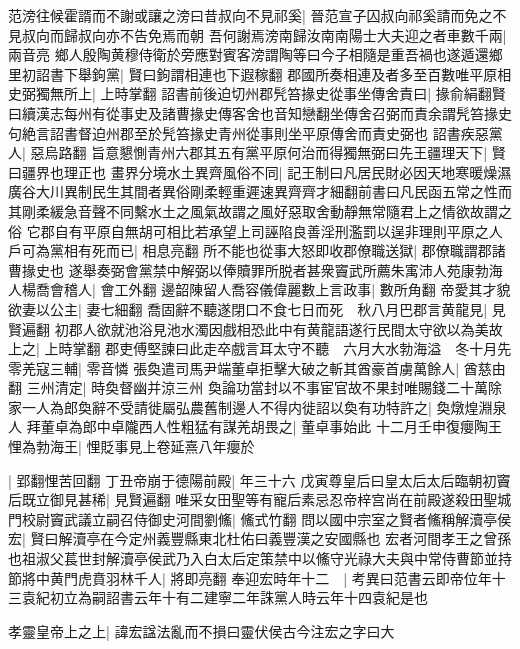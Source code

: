 范滂往候霍諝而不謝或讓之滂曰昔叔向不見祁奚|{
	晉范宣子囚叔向祁奚請而免之不見叔向而歸叔向亦不告免焉而朝}
吾何謝焉滂南歸汝南南陽士大夫迎之者車數千兩|{
	兩音亮}
鄉人殷陶黄穆侍衛於旁應對賓客滂謂陶等曰今子相隨是重吾禍也遂遁還鄉里初詔書下舉鉤黨|{
	賢曰鉤謂相連也下遐稼翻}
郡國所奏相連及者多至百數唯平原相史弼獨無所上|{
	上時掌翻}
詔書前後迫切州郡髠笞掾史從事坐傳舍責曰|{
	掾俞絹翻賢曰續漢志每州有從事史及諸曹掾史傳客舍也音知戀翻坐傳舍召弼而責余謂髠笞掾史句絶言詔書督迫州郡至於髠笞掾史青州從事則坐平原傳舍而責史弼也}
詔書疾惡黨人|{
	惡烏路翻}
旨意懇惻青州六郡其五有黨平原何治而得獨無弼曰先王疆理天下|{
	賢曰疆界也理正也}
畫界分境水土異齊風俗不同|{
	記王制曰凡居民財必因天地寒暖燥濕廣谷大川異制民生其間者異俗剛柔輕重遲速異齊齊才細翻前書曰凡民函五常之性而其剛柔緩急音聲不同繫水土之風氣故謂之風好惡取舍動靜無常隨君上之情欲故謂之俗}
它郡自有平原自無胡可相比若承望上司誣陷良善淫刑濫罰以逞非理則平原之人戶可為黨相有死而已|{
	相息亮翻}
所不能也從事大怒即收郡僚職送獄|{
	郡僚職謂郡諸曹掾史也}
遂舉奏弼會黨禁中解弼以俸贖罪所脱者甚衆竇武所薦朱㝢沛人苑康勃海人楊喬會稽人|{
	會工外翻}
邊韶陳留人喬容儀偉麗數上言政事|{
	數所角翻}
帝愛其才貌欲妻以公主|{
	妻七細翻}
喬固辭不聽遂閉口不食七日而死　秋八月巴郡言黄龍見|{
	見賢遍翻}
初郡人欲就池浴見池水濁因戲相恐此中有黄龍語遂行民間太守欲以為美故上之|{
	上時掌翻}
郡吏傅堅諫曰此走卒戲言耳太守不聽　六月大水勃海溢　冬十月先零羌寇三輔|{
	零音憐}
張奐遣司馬尹端董卓拒擊大破之斬其酋豪首虜萬餘人|{
	酋慈由翻}
三州清定|{
	時奐督幽并涼三州}
奐論功當封以不事宦官故不果封唯賜錢二十萬除家一人為郎奐辭不受請徙屬弘農舊制邊人不得内徙詔以奐有功特許之|{
	奐燉煌淵泉人}
拜董卓為郎中卓隴西人性粗猛有謀羌胡畏之|{
	董卓事始此}
十二月壬申復癭陶王悝為勃海王|{
	悝貶事見上卷延熹八年癭於}


|{
	郢翻悝苦回翻}
丁丑帝崩于德陽前殿|{
	年三十六}
戊寅尊皇后曰皇太后太后臨朝初竇后既立御見甚稀|{
	見賢遍翻}
唯采女田聖等有寵后素忌忍帝梓宫尚在前殿遂殺田聖城門校尉竇武議立嗣召侍御史河間劉鯈|{
	鯈式竹翻}
問以國中宗室之賢者鯈稱解瀆亭侯宏|{
	賢曰解瀆亭在今定州義豐縣東北杜佑曰義豐漢之安國縣也}
宏者河間孝王之曾孫也祖淑父萇世封解瀆亭侯武乃入白太后定策禁中以鯈守光祿大夫與中常侍曹節並持節將中黄門虎賁羽林千人|{
	將即亮翻}
奉迎宏時年十二　|{
	考異曰范書云即帝位年十三袁紀初立為嗣詔書云年十有二建寧二年誅黨人時云年十四袁紀是也}


孝靈皇帝上之上|{
	諱宏諡法亂而不損曰靈伏侯古今注宏之字曰大}


